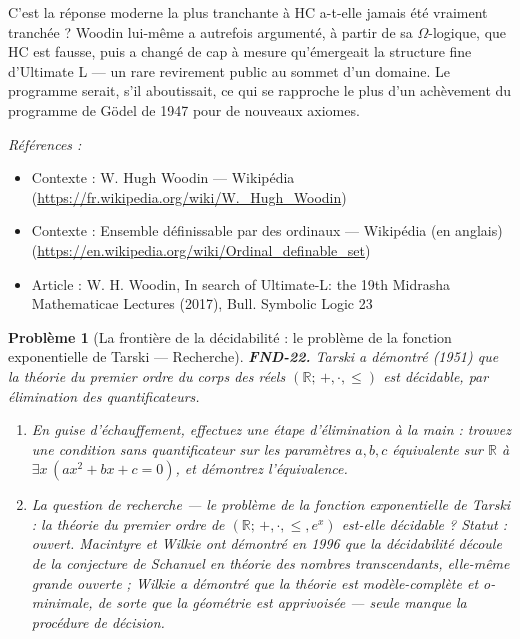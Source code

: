\documentclass[11pt]{article}
\newtheorem{problem}{Problème}
\newenvironment{refs}{\par\small\noindent\emph{Références :}\begin{itemize}\setlength\itemsep{0pt}}{\end{itemize}\normalsize}
\begin{document}
\noindent C'est la réponse moderne la plus tranchante à \og{} HC a-t-elle jamais été vraiment
tranchée ? \fg{} Woodin lui-même a autrefois argumenté, à partir de sa $\Omega$-logique, que HC est fausse,
puis a changé de cap à mesure qu'émergeait la structure fine d'Ultimate L --- un rare revirement
public au sommet d'un domaine. Le programme serait, s'il aboutissait, ce qui se rapproche le plus
d'un achèvement du programme de Gödel de 1947 pour de nouveaux axiomes.

\begin{refs}
\item Contexte : W. Hugh Woodin --- Wikipédia (\url{https://fr.wikipedia.org/wiki/W._Hugh_Woodin})
\item Contexte : Ensemble définissable par des ordinaux --- Wikipédia (en anglais) (\url{https://en.wikipedia.org/wiki/Ordinal_definable_set})
\item Article : W. H. Woodin, \og{} In search of Ultimate-L: the 19th Midrasha Mathematicae Lectures \fg{} (2017), Bull. Symbolic Logic 23
\end{refs}

\bigskip

\begin{problem}[{La frontière de la décidabilité : le problème de la fonction exponentielle de Tarski --- Recherche}]
\textbf{FND-22.} Tarski a démontré (1951) que la théorie du premier ordre du
corps des réels $ (\mathbb{R};\, +, \cdot, \le) $ est décidable, par élimination des
quantificateurs.
\begin{enumerate}
\item[(a)] En guise d'échauffement, effectuez une étape d'élimination à la main : trouvez une condition
sans quantificateur sur les paramètres $ a, b, c $ équivalente sur $\mathbb{R}$ à
$ \exists x\, (a x^2 + b x + c = 0) $, et démontrez l'équivalence.
\item[(b)] La question de recherche --- le \textit{problème de la fonction exponentielle
de Tarski} : la théorie du premier ordre de $ (\mathbb{R};\, +, \cdot, \le, e^x) $
est-elle décidable ? \textit{Statut : ouvert. Macintyre et Wilkie ont démontré en 1996 que la
décidabilité découle de la conjecture de Schanuel en théorie des nombres transcendants, elle-même
grande ouverte ; Wilkie a démontré que la théorie est modèle-complète et o-minimale, de sorte que
la géométrie est apprivoisée --- seule manque la procédure de décision.}
\end{enumerate}

\end{problem}
\end{document}
